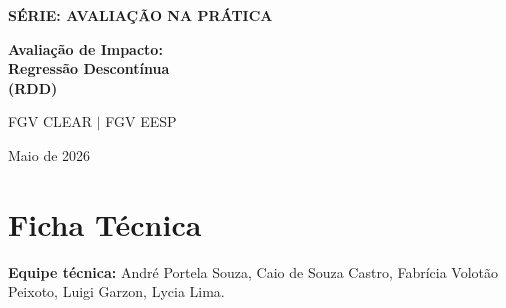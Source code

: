 \documentclass[12pt, a4paper, openany]{book}
\begin{document}
\thispagestyle{empty}
\begin{center}
\vspace*{4cm}
{\Large\bfseries\color{clearlightblue} S\'ERIE: AVALIA\c{C}\~AO NA PR\'ATICA}
\vspace{1.5cm}

{\Huge\bfseries\color{clearblue} Avalia\c{c}\~ao de Impacto:\\[0.3cm]
Regress\~ao Descont\'inua\\[0.3cm]
(RDD)}

\vspace{2cm}
{\large FGV CLEAR $|$ FGV EESP}

\vspace{0.5cm}
{\large Maio de 2026}

\vfill

\begin{abstract}
\noindent Este guia apresenta o m\'etodo de Regress\~ao Descont\'inua (\textit{Regression Discontinuity Design} --- RDD) para avalia\c{c}\~ao de impacto de pol\'iticas p\'ublicas. O RDD se aplica quando a elegibilidade ao tratamento depende de um crit\'erio de corte numa vari\'avel cont\'inua: a descontinuidade gerada nesse ponto permite identificar o efeito causal localmente. O guia cobre o arcabou\c{c}o te\'orico de identifica\c{c}\~ao \citep{Hahn2001,ImbensLemieux2008,LeeLemieux2010}, os casos Sharp e Fuzzy, os testes de validade e robustez \citep{McCrary2008,CattaneoJanssonMa2020} e extens\~oes como m\'ultiplos cutoffs e RDD geogr\'afico. A aplica\c{c}\~ao emp\'irica avalia o impacto do Bolsa Fam\'ilia sobre a frequ\^encia escolar usando a regra de renda per capita como ponto de corte. Todos os exemplos incluem c\'odigo completo em R com os pacotes \texttt{rdrobust} \citep{Calonico2015} e \texttt{rddensity} \citep{CattaneoJanssonMa2018}.
\end{abstract}
\end{center}
\newpage

\thispagestyle{empty}
\chapter*{Ficha T\'ecnica}

\textbf{Equipe t\'ecnica:} Andr\'e Portela Souza, Caio de Souza Castro, Fabr\'icia Volot\~ao Peixoto, Luigi Garzon, Lycia Lima.
\end{document}

